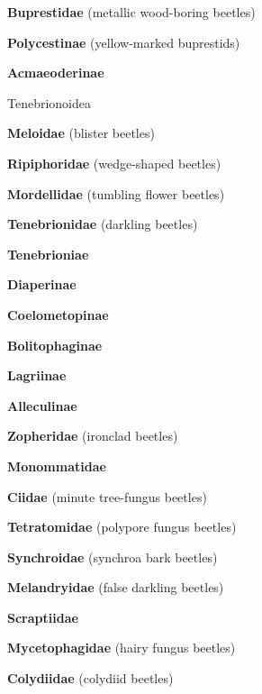 \documentclass[letterpaper,10pt]{article}
\begin{document}
{\makebox[0.6cm]{}  \textbf{Buprestidae} (metallic wood-boring beetles) \par
\makebox[0.8cm]{}  \textbf{Polycestinae} (yellow-marked buprestids) \par
\makebox[0.8cm]{}  \textbf{Acmaeoderinae} \par
\makebox[0.40cm]{}  Tenebrionoidea \par
\makebox[0.6cm]{}  \textbf{Meloidae} (blister beetles) \par
\makebox[0.6cm]{}  \textbf{Ripiphoridae} (wedge-shaped beetles) \par
\makebox[0.6cm]{}  \textbf{Mordellidae} (tumbling flower beetles) \par
\makebox[0.6cm]{}  \textbf{Tenebrionidae} (darkling beetles) \par
\makebox[0.8cm]{}  \textbf{Tenebrioniae} \par
\makebox[0.8cm]{}  \textbf{Diaperinae} \par
\makebox[0.8cm]{}  \textbf{Coelometopinae} \par
\makebox[0.8cm]{}  \textbf{Bolitophaginae} \par
\makebox[0.8cm]{}  \textbf{Lagriinae} \par
\makebox[0.8cm]{}  \textbf{Alleculinae} \par
\makebox[0.6cm]{}  \textbf{Zopheridae} (ironclad beetles) \par
\makebox[0.6cm]{}  \textbf{Monommatidae} \par
\makebox[0.6cm]{}  \textbf{Ciidae} (minute tree-fungus beetles) \par
\makebox[0.6cm]{}  \textbf{Tetratomidae} (polypore fungus beetles) \par
\makebox[0.6cm]{}  \textbf{Synchroidae} (synchroa bark beetles) \par
\makebox[0.6cm]{}  \textbf{Melandryidae} (false darkling beetles) \par
\makebox[0.6cm]{}  \textbf{Scraptiidae}  \par
\makebox[0.6cm]{}  \textbf{Mycetophagidae} (hairy fungus beetles) \par
\makebox[0.6cm]{}  \textbf{Colydiidae} (colydiid beetles) \par
}
\end{document}
